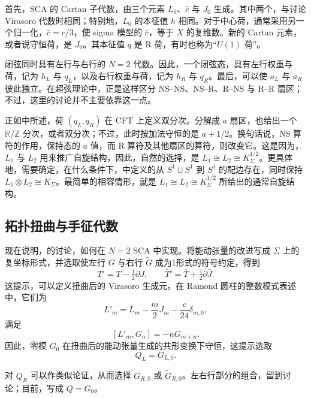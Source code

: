 首先，SCA 的 Cartan 子代数，由三个元素 $L_0$、$\widehat c$ 与 $J_0$ 生成。其中两个，与讨论 Virasoro 代数时相同；特别地，$L_0$ 的本征值 $h$ 相同。对于中心荷，通常采用另一个归一化，$\widehat c=c/3$，使 sigma 模型的 $\widehat c$，等于 $X$ 的复维数。新的 Cartan 元素，或者说守恒荷，是 $J_0$。其本征值 $q$ 是 R 荷，有时也称为“$U(1)$ 荷”。

闭弦同时具有左行与右行的 $N=2$ 代数。因此，一个闭弦态，具有左行权重与荷，记为 $h_L$ 与 $q_L$，以及右行权重与荷，记为 $h_R$ 与 $q_R$。最后，可以使 $a_L$ 与 $a_R$ 彼此独立。在超弦理论中，正是这样区分 NS--NS、NS--R、R--NS 与 R--R 扇区；不过，这里的讨论并不主要依靠这一点。

正如中所述，荷 $(q_L,q_R)$ 在 CFT 上定义双分次。分解成 $a$ 扇区，也给出一个 $\mathbb{R}/\mathbb{Z}$ 分次，或者双分次；不过，此时按加法守恒的是 $a+1/2$。换句话说，NS 算符的作用，保持态的 $a$ 值，而 R 算符及其他扇区的算符，则改变它。这是因为，$L_1$ 与 $L_2$ 用来推广自旋结构，因此，自然的选择，是 $L_1\cong L_2\cong K_\Sigma^{1/2}$。更具体地，需要确定，在什么条件下，中定义的从 $S^1\sqcup S^1$ 到 $S^1$ 的配边存在，同时保持 $L_1\otimes L_2\cong K_\Sigma$。最简单的相容情形，就是 $L_1\cong L_2\cong K_\Sigma^{1/2}$ 所给出的通常自旋结构。

\subsection{拓扑扭曲与手征代数}\label{sec:3.3.4}

现在说明，的讨论，如何在 $N=2$ SCA 中实现。将能动张量的改进写成 $\Sigma$ 上的复坐标形式，并选取使左行 $G$ 与右行 $\widetilde G$ 成为1形式的符号约定，得到
\[
T'=T-\tfrac12\partial J,\qquad
\bar T'=\bar T+\tfrac12\bar\partial\bar J.
\]
这提示，可以定义扭曲后的 Virasoro 生成元。在 Ramond 圆柱的整数模式表述中，它们为
\[
L'_m=L_m-\frac m2J_m-\frac c{24}\delta_{m,0},
\]
满足
\begin{equation}\label{eq:3.92}
[L'_m,G_n]=-nG_{m+n}.
\end{equation}
因此，零模 $G_0$ 在扭曲后的能动张量生成的共形变换下守恒，这提示选取
\begin{equation}\label{eq:3.93}
Q_L=G_{L,0}.
\end{equation}

对 $Q_R$ 可以作类似论证，从而选择 $G_{R,0}$ 或 $\widetilde G_{R,0}$。左右行部分的组合，留到讨论；目前，写成 $Q=G_0$。

